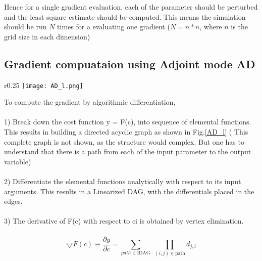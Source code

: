 \documentclass[10pt,a4paper]{report}
\begin{document}
Hence for a single gradient evaluation, each of the parameter should be perturbed and the least square estimate should be computed. This means the simulation should be run $N$ times for a evaluating one gradient ($N = n*n$, where $n$ is the grid size in each dimension) 
\pagebreak


\subsection{Gradient compuataion using Adjoint mode AD}


\begin{wrapfigure}{r}{0.25\textwidth} %
    \centering
    \texttt{[image: AD\_l.png]}
    \caption{}
    \label{AD_l}
\end{wrapfigure}
To compute the gradient by algorithmic differentiation, \\
\\
1) Break down the cost function y = F(c), into sequence of elemental functions. This results in building a directed acyclic graph as shown in Fig.\ref{AD_l} ( This complete graph is not shown, as the structure would complex. But one has to understand that there is a path from each of the input parameter to the output variable)\\
\\
2) Differentiate the elemental functions analytically with respect to its input arguments. This results in a Linearized DAG, with the differentials placed in the edges.\\
\\
3) The derivative of F(c) with respect to ci is obtained by vertex elimination.\\
\\
\begin{equation}
\bigtriangledown F(c) \equiv \frac{\partial y}{\partial c}= \sum_{path \in \text{IDAG}} \; \prod_{(i,j)\in \text{path}} d_{j,i}  
\end{equation}
\end{document}
